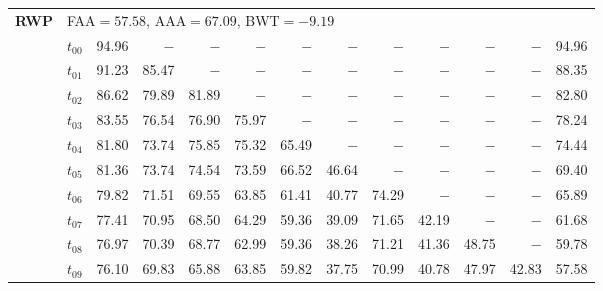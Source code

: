 \begin{table}[ht]
\begin{tabular}{@{}l l r r r r r r r r r r r@{}}
\midrule
\multirow{11}{*}{\textbf{RWP}} & \multicolumn{12}{l}{\quad\small FAA$=57.58$,\; AAA$=67.09$,\; BWT$=-9.19$} \\
 & $t_{00}$ & 94.96 & $-$ & $-$ & $-$ & $-$ & $-$ & $-$ & $-$ & $-$ & $-$ & 94.96 \\
 & $t_{01}$ & 91.23 & 85.47 & $-$ & $-$ & $-$ & $-$ & $-$ & $-$ & $-$ & $-$ & 88.35 \\
 & $t_{02}$ & 86.62 & 79.89 & 81.89 & $-$ & $-$ & $-$ & $-$ & $-$ & $-$ & $-$ & 82.80 \\
 & $t_{03}$ & 83.55 & 76.54 & 76.90 & 75.97 & $-$ & $-$ & $-$ & $-$ & $-$ & $-$ & 78.24 \\
 & $t_{04}$ & 81.80 & 73.74 & 75.85 & 75.32 & 65.49 & $-$ & $-$ & $-$ & $-$ & $-$ & 74.44 \\
 & $t_{05}$ & 81.36 & 73.74 & 74.54 & 73.59 & 66.52 & 46.64 & $-$ & $-$ & $-$ & $-$ & 69.40 \\
 & $t_{06}$ & 79.82 & 71.51 & 69.55 & 63.85 & 61.41 & 40.77 & 74.29 & $-$ & $-$ & $-$ & 65.89 \\
 & $t_{07}$ & 77.41 & 70.95 & 68.50 & 64.29 & 59.36 & 39.09 & 71.65 & 42.19 & $-$ & $-$ & 61.68 \\
 & $t_{08}$ & 76.97 & 70.39 & 68.77 & 62.99 & 59.36 & 38.26 & 71.21 & 41.36 & 48.75 & $-$ & 59.78 \\
 & $t_{09}$ & 76.10 & 69.83 & 65.88 & 63.85 & 59.82 & 37.75 & 70.99 & 40.78 & 47.97 & 42.83 & 57.58 \\
\bottomrule
\end{tabular}
\end{table}

